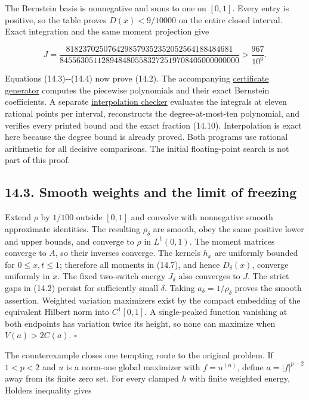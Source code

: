 \documentclass[11pt]{article}
\begin{document}
The Bernstein basis is nonnegative and sums to one on \([0,1]\). Every
entry is positive, so the table proves \(D(x)<9/10000\) on the entire
closed interval. Exact integration and the same moment projection give

\[
J=\frac{8182370250764298579352352052564188484681}
{8455630511289484805583272519708405000000000}
>\frac{967}{10^6}.
\tag{14.10}
\]

Equations (14.3)-\/-(14.4) now prove (14.2). The accompanying
\href{certify_counterexample.py}{certificate generator} computes the
piecewise polynomials and their exact Bernstein coefficients. A separate
\href{check_certificate_independent.py}{interpolation checker} evaluates
the integrals at eleven rational points per interval, reconstructs the
degree-at-most-ten polynomial, and verifies every printed bound and the
exact fraction (14.10). Interpolation is exact here because the degree
bound is already proved. Both programs use rational arithmetic for all
decisive comparisons. The initial floating-point search is not part of
this proof.

\subsection{14.3. Smooth weights and the limit of
freezing}\label{smooth-weights-and-the-limit-of-freezing}

Extend \(\rho\) by \(1/100\) outside \([0,1]\) and convolve with
nonnegative smooth approximate identities. The resulting \(\rho_\delta\)
are smooth, obey the same positive lower and upper bounds, and converge
to \(\rho\) in \(L^1(0,1)\). The moment matrices converge to \(A\), so
their inverses converge. The kernels \(h_x\) are uniformly bounded for
\(0\le x,t\le1\); therefore all moments in (14.7), and hence
\(D_\delta(x)\), converge uniformly in \(x\). The fixed two-switch
energy \(J_\delta\) also converges to \(J\). The strict gaps in (14.2)
persist for sufficiently small \(\delta\). Taking
\(a_\delta=1/\rho_\delta\) proves the smooth assertion. Weighted
variation maximizers exist by the compact embedding of the equivalent
Hilbert norm into \(C^1[0,1]\). A single-peaked function vanishing at
both endpoints has variation twice its height, so none can maximize when
\(V(a)>2C(a)\). \(\square\)

The counterexample closes one tempting route to the original problem. If
\(1<p<2\) and \(u\) is a norm-one global maximizer with \(f=u^{(n)}\),
define \(a=|f|^{p-2}\) away from its finite zero set. For every clamped
\(h\) with finite weighted energy, Holder\textquotesingle s inequality
gives
\end{document}
